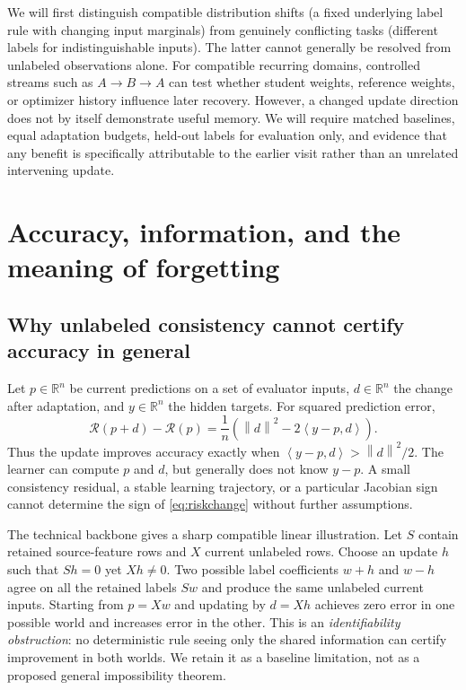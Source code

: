 \documentclass[11pt,a4paper]{article}
\newcommand{\R}{\mathbb{R}}
\newcommand{\norm}[1]{\left\lVert#1\right\rVert}
\newcommand{\ip}[2]{\left\langle#1,#2\right\rangle}
\newcommand{\Risk}{\mathcal{R}}
\begin{document}
We will first distinguish compatible distribution shifts (a fixed underlying label rule with changing input marginals) from genuinely conflicting tasks (different labels for indistinguishable inputs). The latter cannot generally be resolved from unlabeled observations alone. For compatible recurring domains, controlled streams such as $A\to B\to A$ can test whether student weights, reference weights, or optimizer history influence later recovery. However, a changed update direction does not by itself demonstrate useful memory. We will require matched baselines, equal adaptation budgets, held-out labels for evaluation only, and evidence that any benefit is specifically attributable to the earlier visit rather than an unrelated intervening update.

\section{Accuracy, information, and the meaning of forgetting}
\label{sec:accuracy}

\subsection{Why unlabeled consistency cannot certify accuracy in general}
Let $p\in\R^n$ be current predictions on a set of evaluator inputs, $d\in\R^n$ the change after adaptation, and $y\in\R^n$ the hidden targets. For squared prediction error,
\begin{equation}
\Risk(p+d)-\Risk(p)
=\frac1n\left(\norm{d}^2-2\ip{y-p}{d}\right).
\label{eq:riskchange}
\end{equation}
Thus the update improves accuracy exactly when $\ip{y-p}{d}>\norm{d}^2/2$. The learner can compute $p$ and $d$, but generally does not know $y-p$. A small consistency residual, a stable learning trajectory, or a particular Jacobian sign cannot determine the sign of \eqref{eq:riskchange} without further assumptions.

The technical backbone gives a sharp compatible linear illustration. Let $S$ contain retained source-feature rows and $X$ current unlabeled rows. Choose an update $h$ such that $Sh=0$ yet $Xh\ne0$. Two possible label coefficients $w+h$ and $w-h$ agree on all the retained labels $Sw$ and produce the same unlabeled current inputs. Starting from $p=Xw$ and updating by $d=Xh$ achieves zero error in one possible world and increases error in the other. This is an \emph{identifiability obstruction}: no deterministic rule seeing only the shared information can certify improvement in both worlds. We retain it as a baseline limitation, not as a proposed general impossibility theorem.
\end{document}
